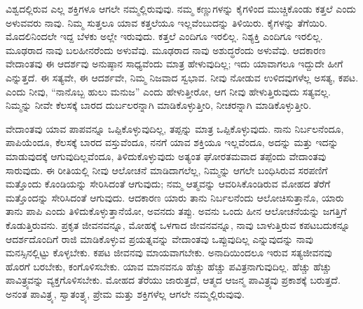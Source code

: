 \vskip 8pt

ವಿಶ್ವದಲ್ಲಿರುವ ಎಲ್ಲ ಶಕ್ತಿಗಳೂ ಆಗಲೇ ನಮ್ಮಲ್ಲಿರುವುವು. ನಮ್ಮ ಕಣ್ಣುಗಳನ್ನು ಕೈಗಳಿಂದ ಮುಚ್ಚಿಕೊಂಡು ಕತ್ತಲೆ ಎಂದು ಅಳುವವರು ನಾವು. ನಿಮ್ಮ ಸುತ್ತಲೂ ಯಾವ ಕತ್ತಲೆಯೂ ಇಲ್ಲವೆಂಬುದನ್ನು ತಿಳಿಯಿರು. ಕೈಗಳನ್ನು ತೆಗೆಯಿರಿ. ಮೊದಲಿನಿಂದಲೇ ಇದ್ದ ಬೆಳಕು ಅಲ್ಲೇ ಇರುವುದು. ಕತ್ತಲೆ ಎಂದಿಗೂ ಇರಲಿಲ್ಲ. ನಿಶ್ಯಕ್ತಿ ಎಂದಿಗೂ ಇರಲಿಲ್ಲ. ಮೂಢರಾದ ನಾವು ಬಲಹೀನರೆಂದು ಅಳುವೆವು. ಮೂಢರಾದ ನಾವು ಅಶುದ್ಧರೆಂದು ಅಳುವೆವು. ಆದಕಾರಣ ವೇದಾಂತವು ಈ ಆದರ್ಶವು ಅನುಷ್ಠಾನ ಸಾಧ್ಯವೆಂದು ಮಾತ್ರ ಹೇಳುವುದಿಲ್ಲ; ಇದು ಯಾವಾಗಲೂ ಇದ್ದುದೇ ಹೀಗೆ ಎನ್ನುತ್ತದೆ. ಈ ಸತ್ಯವೇ, ಈ ಆದರ್ಶವೇ, ನಿಮ್ಮ ನಿಜವಾದ ಸ್ವಭಾವ. ನೀವು ನೋಡುವ ಉಳಿದವುಗಳೆಲ್ಲ ಅಸತ್ಯ, ಕಪಟ. ಎಂದು ನೀವು, “ನಾನೊಬ್ಬ ಹುಲು ಮನುಜ” ಎಂದು ಹೇಳುತ್ತೀರೋ, ಆಗ ನೀವು ಹೇಳುತ್ತಿರುವುದು ಸತ್ಯವಲ್ಲ. ನಿಮ್ಮನ್ನು ನೀವೇ ಕೆಲಸಕ್ಕೆ ಬಾರದ ದುರ್ಬಲರನ್ನಾಗಿ ಮಾಡಿಕೊಳ್ಳುತ್ತೀರಿ, ನೀಚರನ್ನಾಗಿ ಮಾಡಿಕೊಳ್ಳುತ್ತೀರಿ. 

\vskip 8pt

ವೇದಾಂತವು ಯಾವ ಪಾಪವನ್ನೂ ಒಪ್ಪಿಕೊಳ್ಳುವುದಿಲ್ಲ, ತಪ್ಪನ್ನು ಮಾತ್ರ ಒಪ್ಪಿಕೊಳ್ಳುವುದು. ನಾನು ನಿರ್ಬಲನೆಂದೂ, ಪಾಪಿಯೆಂದೂ, ಕೆಲಸಕ್ಕೆ ಬಾರದ ವಸ್ತುವೆಂದೂ, ನನಗೆ ಯಾವ ಶಕ್ತಿಯೂ ಇಲ್ಲವೆಂದೂ, ಅದನ್ನು ಮತ್ತು ಇದನ್ನು ಮಾಡುವುದಕ್ಕೆ ಆಗುವುದಿಲ್ಲವೆಂದೂ, ತಿಳಿದುಕೊಳ್ಳುವುದು ಅತ್ಯಂತ ಘೋರತಮವಾದ ತಪ್ಪೆಂದು ವೇದಾಂತವು ಸಾರುವುದು. ಈ ರೀತಿಯಲ್ಲಿ ನೀವು ಆಲೋಚನೆ ಮಾಡಿದಾಗಲೆಲ್ಲ, ನಿಮ್ಮನ್ನು ಆಗಲೇ ಬಂಧಿಸಿರುವ ಸರಪಣಿಗೆ ಮತ್ತೊಂದು ಕೊಂಡಿಯನ್ನು ಸೇರಿಸಿದಂತೆ ಆಗುವುದು; ನಮ್ಮ ಆತ್ಮವನ್ನು ಆವರಿಸಿಕೊಂಡಿರುವ ಮೋಹದ ತೆರೆಗೆ ಮತ್ತೊಂದನ್ನು ಸೇರಿಸಿದಂತೆ ಆಗುವುದು. ಆದಕಾರಣ ಯಾರು ತಾನು ನಿರ್ಬಲನೆಂದು ಆಲೋಚಿಸುತ್ತಾನೊ, ಯಾರು ತಾನು ಪಾಪಿ ಎಂದು ತಿಳಿದುಕೊಳ್ಳುತ್ತಾನೆಯೋ, ಅವನದು ತಪ್ಪು. ಅವನು ಒಂದು ಹೀನ ಆಲೋಚನೆಯನ್ನು ಜಗತ್ತಿಗೆ ಕೊಡುತ್ತಿರುವನು. ಪ್ರಕೃತ ಜೀವನವನ್ನೂ, ಮೋಹಕ್ಕೆ ಒಳಗಾದ ಜೀವನವನ್ನೂ, ನಾವು ಬಾಳುತ್ತಿರುವ ಕಪಟಬದುಕನ್ನೂ ಆದರ್ಶದೊಂದಿಗೆ ರಾಜಿ ಮಾಡಿಕೊಳ್ಳುವ ಪ್ರಯತ್ನವನ್ನು ವೇದಾಂತವು ಒಪ್ಪುವುದಿಲ್ಲ ಎನ್ನುವುದನ್ನು ನಾವು ಮನಸ್ಸಿನಲ್ಲಿಟ್ಟು ಕೊಳ್ಳಬೇಕು. ಕಪಟ ಜೀವನವು ಮಾಯವಾಗಬೇಕು. ಅನಾದಿಯಿಂದಲೂ ಇರುವ ಸತ್ಯಜೀವನವು ಹೊರಗೆ ಬರಬೇಕು, ಕಂಗೊಳಿಸಬೇಕು. ಯಾವ ಮಾನವನೂ ಹೆಚ್ಚು ಹೆಚ್ಚು ಪವಿತ್ರನಾಗುವುದಿಲ್ಲ. ಹೆಚ್ಚು ಹೆಚ್ಚು ಪಾವಿತ್ರ್ಯವನ್ನು ವ್ಯಕ್ತಗೊಳಿಸಬೇಕು. ಮೋಹದ ತೆರೆಯು ಜಾರುತ್ತದೆ, ಆತ್ಮದ ಆಜನ್ಮ ಪಾವಿತ್ರ್ಯವು ಪ್ರಕಾಶಕ್ಕೆ ಬರುತ್ತದೆ. ಅನಂತ ಪಾವಿತ್ರ್ಯ, ಸ್ವಾತಂತ್ರ್ಯ, ಪ್ರೇಮ ಮತ್ತು ಶಕ್ತಿಗಳೆಲ್ಲ ಆಗಲೇ ನಮ್ಮಲ್ಲಿರುವುವು. 

\vskip 9pt

